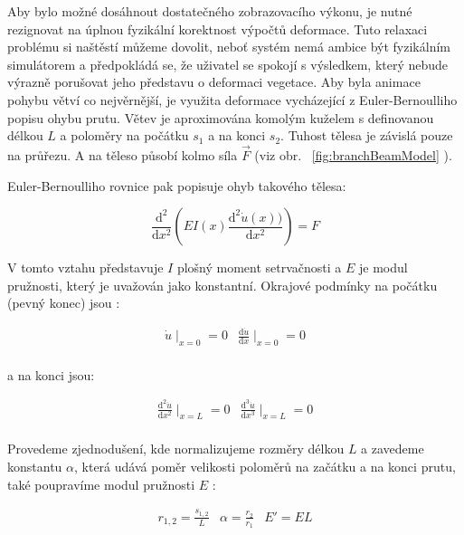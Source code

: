 Aby bylo možné dosáhnout dostatečného zobrazovacího výkonu, je nutné rezignovat na úplnou fyzikální korektnost výpočtů deformace. Tuto relaxaci problému si naštěstí můžeme dovolit, neboť systém nemá ambice být fyzikálním simulátorem a předpokládá se, že uživatel se spokojí s výsledkem, který nebude výrazně porušovat jeho představu o deformaci vegetace.
Aby byla animace pohybu větví co nejvěrnější, je využita deformace vycházející z Euler-Bernoulliho popisu ohybu prutu. Větev je aproximována komolým kuželem s definovanou délkou $L$ a poloměry na počátku $s_1$ a na konci $s_2$. Tuhost tělesa je závislá pouze na průřezu. A na těleso působí kolmo síla $\vec{F}$ (viz obr. ~\ref{fig:branchBeamModel} ).

Euler-Bernoulliho rovnice pak popisuje ohyb takového tělesa:

\begin{equation}
\frac{\mathrm{d}^2 }{\mathrm{d} x^2}(EI(x)\frac{\mathrm{d}^2 \dot{u} (x))}{\mathrm{d} x^2} ) = F
\end{equation}

V tomto vztahu představuje $I$ plošný moment setrvačnosti a $E$ je modul pružnosti, který je uvažován jako konstantní. Okrajové podmínky na počátku (pevný konec) jsou :

\begin{equation}
\begin{array}{cc}
\dot{u} \mid _{x=0} = 0 & \frac{\mathrm{d} \dot{u} }{\mathrm{d} x}\mid _{x=0} = 0 \\
\end{array}
\end{equation}

a na konci jsou:

\begin{equation}
\begin{array}{cc}
\frac{\mathrm{d}^2 \dot{u} }{\mathrm{d} x^2} \mid _{x=L} = 0 & \frac{\mathrm{d}^3 \dot{u} }{\mathrm{d} x^3}\mid _{x=L} = 0 \\
\end{array}
\end{equation}

Provedeme zjednodušení, kde normalizujeme rozměry délkou $L$ a zavedeme konstantu $\alpha$, která udává poměr velikosti poloměrů na začátku a na konci prutu, také poupravíme modul pružnosti $E$ :

\begin{equation}
\begin{array}{ccc}
r_{1,2} = \frac{s_{1,2}}{L} &\alpha = \frac{r_2}{r_1} & {E}'= EL\\
\end{array}
\end{equation}


